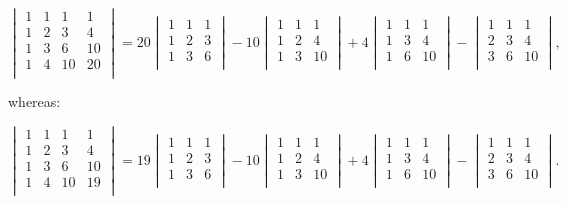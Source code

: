 \documentclass{article}
\begin{document}
\[
\begin{vmatrix}
1 & 1 & 1 & 1\\
1 & 2 & 3 & 4\\
1 & 3 & 6 & 10\\
1 & 4 & 10 & 20\\
\end{vmatrix}
=
20 \begin{vmatrix}
1 & 1 & 1\\
1 & 2 & 3\\
1 & 3 & 6\\
\end{vmatrix}
-10 \begin{vmatrix}
1 & 1 & 1\\
1 & 2 & 4\\
1 & 3 & 10\\
\end{vmatrix}
+4 \begin{vmatrix}
1 & 1 & 1\\
1 & 3 & 4\\
1 & 6 & 10\\
\end{vmatrix}
-\begin{vmatrix}
1 & 1 & 1\\
2 & 3 & 4\\
3 & 6 & 10\\
\end{vmatrix},
\]

whereas:

\[
\begin{vmatrix}
1 & 1 & 1 & 1\\
1 & 2 & 3 & 4\\
1 & 3 & 6 & 10\\
1 & 4 & 10 & 19\\
\end{vmatrix}
=
19 \begin{vmatrix}
1 & 1 & 1\\
1 & 2 & 3\\
1 & 3 & 6\\
\end{vmatrix}
-10 \begin{vmatrix}
1 & 1 & 1\\
1 & 2 & 4\\
1 & 3 & 10\\
\end{vmatrix}
+4 \begin{vmatrix}
1 & 1 & 1\\
1 & 3 & 4\\
1 & 6 & 10\\
\end{vmatrix}
-\begin{vmatrix}
1 & 1 & 1\\
2 & 3 & 4\\
3 & 6 & 10\\
\end{vmatrix}.
\]
\end{document}

